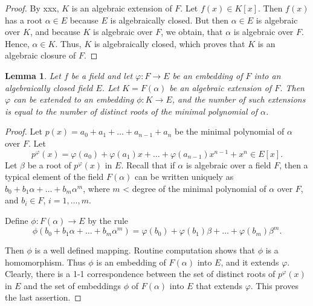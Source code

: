 \documentclass[draft]{article}
\newtheorem{lem}[thm]{Lemma}
\theoremstyle{definition}
\theoremstyle{remark}
\begin{document}
            \begin{proof}
                By xxx, $K$ is an algebraic extension of $F$. Let $f(x) \in K[x]$. Then $f(x)$ has a root $\alpha \in E$ because $E$ is algebraically closed. But then $\alpha \in E$ is algebraic over $K$, and because $K$ is algebraic over $F$, we obtain, that $\alpha$ is algebraic over $F$. Hence, $\alpha \in K$. Thus, $K$ is algebraically closed, which proves that $K$ is an algebraic closure of $F$.
            \end{proof}
            
            \begin{lem}
                Let $f$ be a field and let $\varphi: F \to E$ be an embedding of $F$ into an algebraically closed field $E$. Let $K = F(\alpha)$ be an algebraic extension of $F$. Then $\varphi$ can be extended to an embedding $\phi: K \to E$, and the number of such extensions is equal to the number of distinct roots of the minimal polynomial of $\alpha$.
            \end{lem}
            
            \begin{proof}
                Let $p(x) = a_0 + a_1 + \dots + a_{n - 1} + a_n$ be the minimal polynomial of $\alpha$ over $F$. Let
                \begin{equation*}
                    p^\varphi(x) = \varphi(a_0) + \varphi(a_1)x + \dots + \varphi(a_{n - 1})x^{n - 1} + x^n \in E[x].
                \end{equation*}
                Let $\beta$ be a root of $p^\varphi(x)$ in $E$. Recall that if $\alpha$ is algebraic over a field $F$, then a typical element of the field $F(\alpha)$ can be written uniquely as $b_0 + b_1\alpha + \dots + b_m\alpha^m$, where $m$ < degree of the minimal polynomial of $\alpha$ over $F$, and $b_i \in F$, $i = 1, \dots, m$.\par
                Define $\phi: F(\alpha) \to E$ by the rule
                \begin{equation*}
                    \phi(b_0 + b_1\alpha + \dots + b_m\alpha^m) = \varphi(b_0) + \varphi(b_1)\beta + \dots + \varphi(b_m)\beta^m.
                \end{equation*}\par
                Then $\phi$ is a well defined mapping. Routine computation shows that $\phi$ is a homomorphism. Thus $\phi$ is an embedding of $F(\alpha)$ into $E$, and it extends $\varphi$. Clearly, there is a 1-1 correspondence between the set of distinct roots of $p^\varphi(x)$ in $E$ and the set of embeddings $\phi$ of $F(\alpha)$ into $E$ that extends $\varphi$. This proves the last assertion.
            \end{proof}
            
\end{document}
